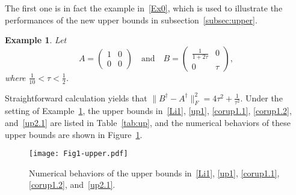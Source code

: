 \documentclass[11pt]{article}
\newtheorem{example}{Example}[section]
\begin{document}
The first one is in fact the example in~\eqref{Ex0}, which is used to illustrate the performances of the new upper bounds in subsection~\ref{subsec:upper}.

\begin{example}\rm\label{Ex1}
Let
\begin{displaymath}
A=\begin{pmatrix}
1 & 0 \\
0 & 0
\end{pmatrix} \quad \text{and} \quad B=\begin{pmatrix}
\frac{1}{1+2\tau} & 0 \\
0 & \tau
\end{pmatrix},
\end{displaymath}
where $\frac{1}{10}<\tau<\frac{1}{2}$.
\end{example}

Straightforward calculation yields that $\|B^{\dagger}-A^{\dagger}\|_{F}^{2}=4\tau^{2}+\frac{1}{\tau^{2}}$. Under the setting of Example~\ref{Ex1}, the upper bounds in~\eqref{Li1}, \eqref{up1}, \eqref{corup1.1}, \eqref{corup1.2}, and~\eqref{up2.1} are listed in Table~\ref{tab:up}, and the numerical behaviors of these upper bounds are shown in Figure~\ref{fig:up}.

\begin{table}[h!!]
\centering
{}
\caption{\small The upper bounds in~\eqref{Li1}, \eqref{up1}, \eqref{corup1.1}, \eqref{corup1.2}, and~\eqref{up2.1}.}
\label{tab:up}
\end{table}

\begin{figure}[h!!]
\centering
\texttt{[image: Fig1-upper.pdf]} 
\caption{\small Numerical behaviors of the upper bounds in~\eqref{Li1}, \eqref{up1}, \eqref{corup1.1}, \eqref{corup1.2}, and~\eqref{up2.1}.}
\label{fig:up}
\end{figure}
\end{document}

